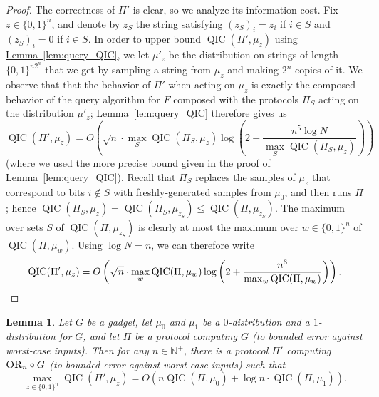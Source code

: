 \documentclass[10pt,a4paper]{article}
\newtheorem{lemma}[theorem]{Lemma}
\theoremstyle{definition}
\newcommand{\lem}[1]{\hyperref[lem:#1]{Lemma~\ref*{lem:#1}}}
\newcommand{\B}{\{0,1\}}
\renewcommand{\>}{\rangle}
\newcommand{\<}{\langle}
\newcommand{\OR}{\textsc{OR}}
\DeclareMathOperator{\QIC}{QIC}
\begin{document}
\begin{proof}
The correctness of $\Pi'$ is clear, so we analyze its information cost.
Fix $z\in\B^n$, and denote by $z_S$ the string satisfying
$(z_S)_i=z_i$ if $i\in S$ and $(z_S)_i=0$ if $i\in S$.
In order to upper bound $\QIC(\Pi',\mu_z)$ using \lem{query_QIC},
we let $\mu'_z$ be the distribution on strings of length
$\B^{n 2^n}$ that we get by sampling a string from $\mu_z$
and making $2^n$ copies of it.
We observe that that the behavior of $\Pi'$ when acting on $\mu_z$
is exactly the composed behavior of the query algorithm for $F$
composed with the protocols $\Pi_S$ acting on the distribution
$\mu'_z$; \lem{query_QIC} therefore gives us
\[\QIC(\Pi',\mu_z)=O\left(\sqrt{n}\cdot
\max_S\QIC(\Pi_S,\mu_z)
\log\left(2+\frac{n^5\log N}{\max_S\QIC(\Pi_S,\mu_z)}\right)\right)\]
(where we used the more precise bound given in the proof
of \lem{query_QIC}).
Recall that $\Pi_S$ replaces the samples of $\mu_z$
that correspond to bits $i\notin S$ with freshly-generated
samples from $\mu_0$, and then runs $\Pi$; hence
$\QIC(\Pi_S,\mu_z)=\QIC(\Pi_S,\mu_{z_S})\le \QIC(\Pi,\mu_{z_S})$.
The maximum over sets $S$ of $\QIC(\Pi,\mu_{z_S})$
is clearly at most the maximum over $w\in\B^n$ of $\QIC(\Pi,\mu_w)$.
Using $\log N=n$, we can therefore write
\[\QIC(\Pi',\mu_z)=O\left(\sqrt{n}\cdot
\max_w\QIC(\Pi,\mu_w)
\log\left(2+\frac{n^6}{\max_w\QIC(\Pi,\mu_w)}\right)\right).\qedhere\]
\end{proof}

\begin{lemma}\label{lem:OR_protocol}
Let $G$ be a gadget, let $\mu_0$ and $\mu_1$ be a $0$-distribution
and a $1$-distribution for $G$, and let $\Pi$ be a protocol
computing $G$ (to bounded error against worst-case inputs).
Then for any $n\in\mathbb{N}^+$, there is a protocol $\Pi'$
computing $\OR_n\circ G$ (to bounded error against worst-case inputs)
such that
\[\max_{z\in\B^n}\QIC\left(\Pi',\mu_z\right)
=O(n\QIC(\Pi,\mu_0)+\log n\cdot \QIC(\Pi,\mu_1)).\]
\end{lemma}
\end{document}
